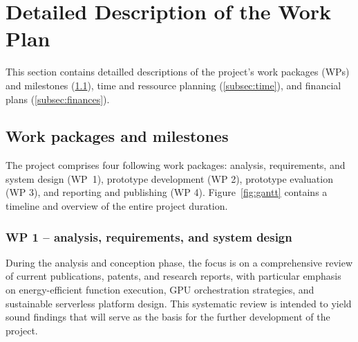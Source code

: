 \clearpage
\section{Detailed Description of the Work Plan}

This section contains detailled descriptions of the project's work packages (WPs) and milestones (\cref{subsec:wp}), time and ressource planning (\cref{subsec:time}), and financial plans (\cref{subsec:finances}).

\subsection{Work packages and milestones}\label{subsec:wp}

The project comprises four following work packages: analysis, requirements, and system design (WP~1), prototype development (WP 2), prototype evaluation (WP 3), and reporting and publishing (WP 4).
Figure~\ref{fig:gantt} contains a timeline and overview of the entire project duration.

\subsubsection{WP 1 -- analysis, requirements, and system design}

%
%
%
%
%
%
%
%

During the analysis and conception phase, the focus is on a comprehensive review of current publications, patents, and research reports, with particular emphasis on energy-efficient function execution, GPU orchestration strategies, and sustainable serverless platform design.
This systematic review is intended to yield sound findings that will serve as the basis for the further development of the project.


